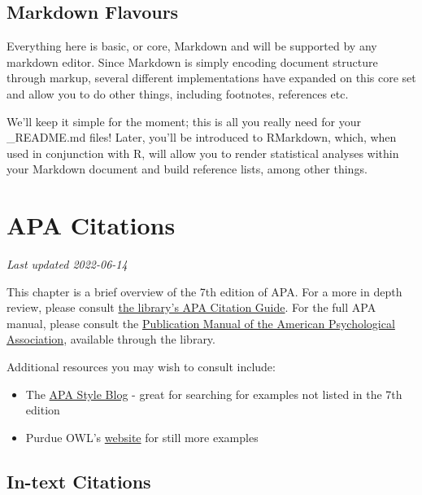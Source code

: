 \documentclass[
]{book}
\providecommand{\tightlist}{%
  \setlength{\itemsep}{0pt}\setlength{\parskip}{0pt}}
\begin{document}
\hypertarget{markdown-flavours}{%
\section{Markdown Flavours}\label{markdown-flavours}}

Everything here is basic, or core, Markdown and will be supported by any markdown editor. Since Markdown is simply encoding document structure through markup, several different implementations have expanded on this core set and allow you to do other things, including footnotes, references etc.

We'll keep it simple for the moment; this is all you really need for your \_README.md files! Later, you'll be introduced to RMarkdown, which, when used in conjunction with R, will allow you to render statistical analyses within your Markdown document and build reference lists, among other things.

\hypertarget{apa-citations}{%
\chapter{APA Citations}\label{apa-citations}}

\emph{Last updated 2022-06-14}

This chapter is a brief overview of the 7th edition of APA. For a more in depth review, please consult \href{https://guides.library.ubc.ca/apacitationstyle}{the library's APA Citation Guide}. For the full APA manual, please consult the \href{http://resolve.library.ubc.ca/cgi-bin/catsearch?bid=10057275}{Publication Manual of the American Psychological Association}, available through the library.

Additional resources you may wish to consult include:

\begin{itemize}
\tightlist
\item
  The \href{https://apastyle.apa.org/blog/}{APA Style Blog} - great for searching for examples not listed in the 7th edition
\item
  Purdue OWL's \href{https://owl.purdue.edu/owl/research_and_citation/apa_style/apa_formatting_and_style_guide/general_format.html}{website} for still more examples
\end{itemize}

\hypertarget{in-text-citations}{%
\section{In-text Citations}\label{in-text-citations}}
\end{document}
